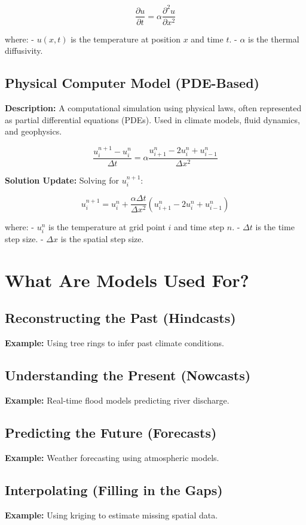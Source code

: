 \documentclass{article}
\begin{document}
\[
\frac{\partial u}{\partial t} = \alpha \frac{\partial^2 u}{\partial x^2}
\]

where:
- \( u(x,t) \) is the temperature at position \( x \) and time \( t \).
- \( \alpha \) is the thermal diffusivity.

\subsection{Physical Computer Model (PDE-Based)}
\textbf{Description:} A computational simulation using physical laws, often represented as partial differential equations (PDEs). Used in climate models, fluid dynamics, and geophysics.

\[
\frac{u_i^{n+1} - u_i^n}{\Delta t} = \alpha \frac{u_{i+1}^n - 2u_i^n + u_{i-1}^n}{\Delta x^2}
\]

\textbf{Solution Update:} Solving for \( u_i^{n+1} \):

\[
u_i^{n+1} = u_i^n + \frac{\alpha \Delta t}{\Delta x^2} \left( u_{i+1}^n - 2u_i^n + u_{i-1}^n \right)
\]

where:
- \( u_i^n \) is the temperature at grid point \( i \) and time step \( n \).
- \( \Delta t \) is the time step size.
- \( \Delta x \) is the spatial step size.



\section{What Are Models Used For?}

\subsection{Reconstructing the Past (Hindcasts)}
\textbf{Example:} Using tree rings to infer past climate conditions.

\subsection{Understanding the Present (Nowcasts)}
\textbf{Example:} Real-time flood models predicting river discharge.

\subsection{Predicting the Future (Forecasts)}
\textbf{Example:} Weather forecasting using atmospheric models.

\subsection{Interpolating (Filling in the Gaps)}
\textbf{Example:} Using kriging to estimate missing spatial data.
\end{document}
